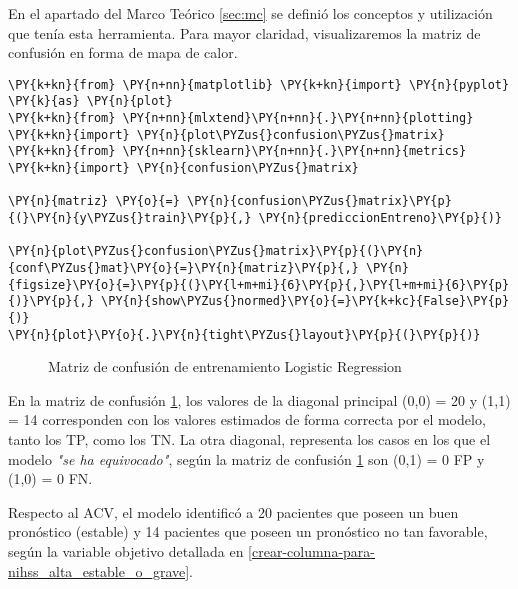 	En el apartado del Marco Teórico \ref{sec:mc} se definió los conceptos y utilización que tenía esta herramienta. Para mayor claridad, visualizaremos la matriz de confusión en forma de mapa de calor.

    \begin{tcolorbox}[breakable, size=fbox, boxrule=1pt, pad at break*=1mm,colback=cellbackground, colframe=cellborder]
\begin{Verbatim}[commandchars=\\\{\}]
\PY{k+kn}{from} \PY{n+nn}{matplotlib} \PY{k+kn}{import} \PY{n}{pyplot} \PY{k}{as} \PY{n}{plot}
\PY{k+kn}{from} \PY{n+nn}{mlxtend}\PY{n+nn}{.}\PY{n+nn}{plotting} \PY{k+kn}{import} \PY{n}{plot\PYZus{}confusion\PYZus{}matrix}
\PY{k+kn}{from} \PY{n+nn}{sklearn}\PY{n+nn}{.}\PY{n+nn}{metrics} \PY{k+kn}{import} \PY{n}{confusion\PYZus{}matrix}

\PY{n}{matriz} \PY{o}{=} \PY{n}{confusion\PYZus{}matrix}\PY{p}{(}\PY{n}{y\PYZus{}train}\PY{p}{,} \PY{n}{prediccionEntreno}\PY{p}{)}

\PY{n}{plot\PYZus{}confusion\PYZus{}matrix}\PY{p}{(}\PY{n}{conf\PYZus{}mat}\PY{o}{=}\PY{n}{matriz}\PY{p}{,} \PY{n}{figsize}\PY{o}{=}\PY{p}{(}\PY{l+m+mi}{6}\PY{p}{,}\PY{l+m+mi}{6}\PY{p}{)}\PY{p}{,} \PY{n}{show\PYZus{}normed}\PY{o}{=}\PY{k+kc}{False}\PY{p}{)}
\PY{n}{plot}\PY{o}{.}\PY{n}{tight\PYZus{}layout}\PY{p}{(}\PY{p}{)}
\end{Verbatim}
\end{tcolorbox}

\begin{center}
    	\begin{figure}[H]
	\centering
	\caption{Matriz de confusión de entrenamiento Logistic Regression}
	\label{fig:mcelr}
	\end{figure}
\end{center}
    
    En la matriz de confusión \ref{fig:mcelr}, los valores de la diagonal principal (0,0) = 20 y (1,1) = 14 corresponden con los valores estimados de forma correcta por el modelo, tanto los TP, como los TN. La otra diagonal, representa los casos en los que el modelo \textit{"se ha equivocado"}, según la matriz de confusión \ref{fig:mcelr} son (0,1) = 0 FP y (1,0) = 0 FN.
\par Respecto al ACV, el modelo identificó a 20 pacientes que poseen un buen pronóstico (estable) y 14 pacientes que poseen un pronóstico no tan favorable, según la variable objetivo detallada en \ref{crear-columna-para-nihss_alta_estable_o_grave}.\\